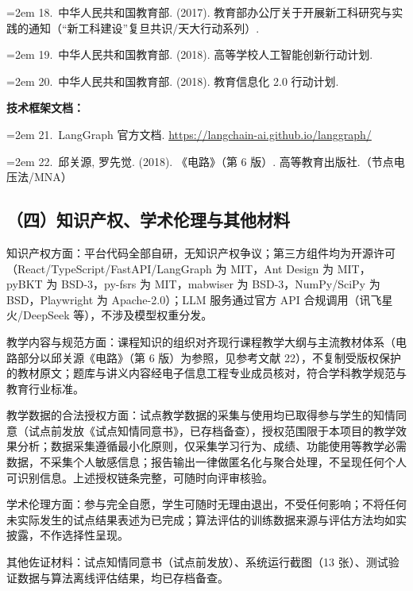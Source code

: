 \documentclass[zihao=-4,a4paper,UTF8,fontset=windows]{ctexart}
\begin{document}
\noindent\hangindent=2em 18.~中华人民共和国教育部. (2017). 教育部办公厅关于开展新工科研究与实践的通知（“新工科建设”复旦共识/天大行动系列）.



\noindent\hangindent=2em 19.~中华人民共和国教育部. (2018). 高等学校人工智能创新行动计划.



\noindent\hangindent=2em 20.~中华人民共和国教育部. (2018). 教育信息化 2.0 行动计划.



\textbf{技术框架文档：}



\noindent\hangindent=2em 21.~LangGraph 官方文档. \url{https://langchain-ai.github.io/langgraph/}



\noindent\hangindent=2em 22.~邱关源, 罗先觉. (2018). 《电路》（第 6 版）. 高等教育出版社.（节点电压法/MNA）

\subsection{（四）知识产权、学术伦理与其他材料}


知识产权方面：平台代码全部自研，无知识产权争议；第三方组件均为开源许可（React/TypeScript/FastAPI/LangGraph 为 MIT，Ant Design 为 MIT，pyBKT 为 BSD-3，py-fsrs 为 MIT，mabwiser 为 BSD-3，NumPy/SciPy 为 BSD，Playwright 为 Apache-2.0）；LLM 服务通过官方 API 合规调用（讯飞星火/DeepSeek 等），不涉及模型权重分发。



教学内容与规范方面：课程知识的组织对齐现行课程教学大纲与主流教材体系（电路部分以邱关源《电路》（第 6 版）为参照，见参考文献 22），不复制受版权保护的教材原文；题库与讲义内容经电子信息工程专业成员核对，符合学科教学规范与教育行业标准。

教学数据的合法授权方面：试点教学数据的采集与使用均已取得参与学生的知情同意（试点前发放《试点知情同意书》，已存档备查），授权范围限于本项目的教学效果分析；数据采集遵循最小化原则，仅采集学习行为、成绩、功能使用等教学必需数据，不采集个人敏感信息；报告输出一律做匿名化与聚合处理，不呈现任何个人可识别信息。上述授权链条完整，可随时向评审核验。

学术伦理方面：参与完全自愿，学生可随时无理由退出，不受任何影响；不将任何未实际发生的试点结果表述为已完成；算法评估的训练数据来源与评估方法均如实披露，不作选择性呈现。

其他佐证材料：试点知情同意书（试点前发放）、系统运行截图（13 张）、测试验证数据与算法离线评估结果，均已存档备查。
\end{document}
